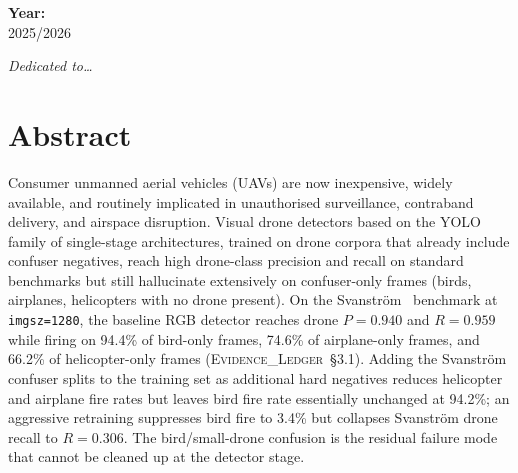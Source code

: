 \documentclass[12pt,a4paper,oneside,openright]{book}
\begin{document}
\begin{titlepage}
\begin{center}
    \vspace{3mm}
    {\normalsize{\textbf{Year:}}{\normalsize\vspace{1mm}
    \\ \normalsize{2025/2026}}}
\end{center}

\end{titlepage}

\doublespacing

\cleardoublepage
\thispagestyle{empty}
\begin{flushright}
\itshape Dedicated to\ldots %
\end{flushright}
\cleardoublepage

\chapter*{Abstract}

Consumer unmanned aerial vehicles (UAVs) are now inexpensive, widely available, and routinely implicated in unauthorised surveillance, contraband delivery, and airspace disruption. Visual drone detectors based on the YOLO family of single-stage architectures, trained on drone corpora that already include confuser negatives, reach high drone-class precision and recall on standard benchmarks but still hallucinate extensively on confuser-only frames (birds, airplanes, helicopters with no drone present). On the Svanstr\"om~\cite{svanstrom2021real} benchmark at \texttt{imgsz=1280}, the baseline RGB detector reaches drone $P=0.940$ and $R=0.959$ while firing on 94.4\% of bird-only frames, 74.6\% of airplane-only frames, and 66.2\% of helicopter-only frames (\textsc{Evidence\_Ledger}~\S3.1). Adding the Svanstr\"om confuser splits to the training set as additional hard negatives reduces helicopter and airplane fire rates but leaves bird fire rate essentially unchanged at 94.2\%; an aggressive retraining suppresses bird fire to 3.4\% but collapses Svanstr\"om drone recall to $R=0.306$. The bird/small-drone confusion is the residual failure mode that cannot be cleaned up at the detector stage.
\end{document}
